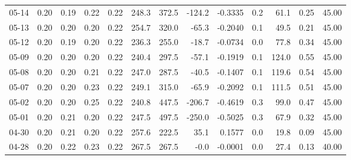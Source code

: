 \begin{threeparttable}
{\begin{tabular}{lrrrrrrrrrrrr}
  05-14 &          0.20 &          0.19 &          0.22 &        0.22 &               248.3 &               372.5 &     -124.2 &      -0.3335 &                 0.2 &             61.1 &            0.25 &                  45.00 \\
  05-13 &          0.20 &          0.20 &          0.20 &        0.22 &               254.7 &               320.0 &      -65.3 &      -0.2040 &                 0.1 &             49.5 &            0.21 &                  45.00 \\
  05-12 &          0.20 &          0.19 &          0.20 &        0.22 &               236.3 &               255.0 &      -18.7 &      -0.0734 &                 0.0 &             77.8 &            0.34 &                  45.00 \\
  05-09 &          0.20 &          0.20 &          0.20 &        0.22 &               240.4 &               297.5 &      -57.1 &      -0.1919 &                 0.1 &            124.0 &            0.55 &                  45.00 \\
  05-08 &          0.20 &          0.20 &          0.21 &        0.22 &               247.0 &               287.5 &      -40.5 &      -0.1407 &                 0.1 &            119.6 &            0.54 &                  45.00 \\
  05-07 &          0.20 &          0.20 &          0.23 &        0.22 &               249.1 &               315.0 &      -65.9 &      -0.2092 &                 0.1 &            111.5 &            0.51 &                  45.00 \\
  05-02 &          0.20 &          0.20 &          0.25 &        0.22 &               240.8 &               447.5 &     -206.7 &      -0.4619 &                 0.3 &             99.0 &            0.47 &                  45.00 \\
  05-01 &          0.20 &          0.21 &          0.20 &        0.22 &               247.5 &               497.5 &     -250.0 &      -0.5025 &                 0.3 &             67.9 &            0.32 &                  45.00 \\
  04-30 &          0.20 &          0.21 &          0.20 &        0.22 &               257.6 &               222.5 &       35.1 &       0.1577 &                 0.0 &             19.8 &            0.09 &                  45.00 \\
  04-28 &          0.20 &          0.22 &          0.23 &        0.22 &               267.5 &               267.5 &       -0.0 &      -0.0001 &                 0.0 &             27.4 &            0.13 &                  40.00 \\

\end{tabular}}
\end{threeparttable}
